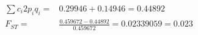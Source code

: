 \documentclass[12pt, addpoints]{exam}
\newcommand*\AnswerBox[2]{%
	\parbox[t][#1]{0.92\textwidth}{%
		\begin{solution}#2\end{solution}}
	\vspace{\stretch{1}}
}
\newenvironment{AnswerPage}[1]
{\begin{minipage}[t][#1]{0.92\textwidth}%
		\begin{solution}}
		{\end{solution}\end{minipage}
	\vspace{\stretch{1}}}
\begin{document}
\begin{questions}
\begin{AnswerPage}{0.5\textheight}
\begin{align*}
%
\sum c_i2p_iq_i =& 0.29946 + 0.14946 = 0.44892\\
%
F_{ST} =& \frac{0.459672 - 0.44892}{0.459672} = 0.02339059 = \mathbf{0.023}
%
\end{align*}
%
%
%
%
%
%
%
%
%
%
%

\end{AnswerPage}

%
%




\end{questions}
\end{document}
